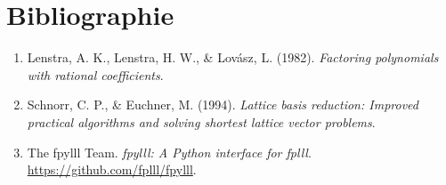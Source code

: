 \documentclass[12pt,a4paper]{article}
\begin{document}
\section{Bibliographie}
\begin{enumerate}
    \item Lenstra, A. K., Lenstra, H. W., \& Lovász, L. (1982). \textit{Factoring polynomials with rational coefficients}.
    \item Schnorr, C. P., \& Euchner, M. (1994). \textit{Lattice basis reduction: Improved practical algorithms and solving shortest lattice vector problems}.
    \item The fpylll Team. \textit{fpylll: A Python interface for fplll}. \url{https://github.com/fplll/fpylll}.
\end{enumerate}
\end{document}
